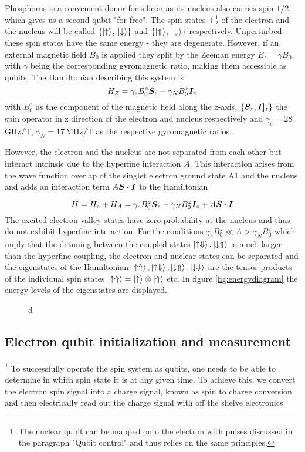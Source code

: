 Phosphorus is a convenient donor for silicon as its nucleus also carries spin $1/2$ which gives us a second qubit "for free". 
The spin states $\pm \frac{1}{2}$ of the electron and the nucleus will be called $\{\ket{\uparrow}$, $\ket{\downarrow}\}$ and $\{\ket{\Uparrow}$, $\ket{\Downarrow}\}$ respectively. Unperturbed these spin states have the same energy - they are degenerate. However, if an external magnetic field $B_0$ is applied they split by the Zeeman energy $E_z=\gamma B_0$, with $\gamma$ being the corresponding gyromagnetic ratio, making them accessible as qubits. The Hamiltonian describing this system is 
\begin{equation}
H_Z=\gamma_e B^z_0 \boldsymbol{S}_z-\gamma_N B_0^z \boldsymbol{I}_z
\end{equation}
with $B_0^z$ as the component of the magnetic field along the z-axis, $\{\boldsymbol{S}_z,\boldsymbol{I]}_z\}$ the spin operator in z direction of the electron and nucleus respectively and $\gamma_e=28\,$GHz/T, $\gamma_N=17\,$MHz/T as the respective gyromagnetic ratios.

However, the electron and the nucleus are not separated from each other but interact intrinsic due to the hyperfine interaction $A$. This interaction arises from the wave function overlap of the singlet electron ground state A1 and the nucleus and adds an interaction term $A\boldsymbol{S\cdot I}$ to the Hamiltonian

\begin{equation}
H=H_z+H_A=\gamma_e B^z_0 \boldsymbol{S}_z-\gamma_N B_0^z \boldsymbol{I}_z + A\boldsymbol{S\cdot I}
\end{equation}
The excited electron valley states have zero probability at the nucleus and thus do not exhibit hyperfine interaction. 
For the conditions $\gamma_eB_0^z \ll A>\gamma_N B_0^z $ which imply that the detuning between the coupled states $\ket{\uparrow\Downarrow},\ket{\downarrow\Uparrow}$ is much larger than the hyperfine coupling, the electron and nuclear states can be separated and the eigenstates of the Hamiltonian $\ket{\uparrow\Uparrow},\ket{\uparrow\Downarrow},\ket{\downarrow\Uparrow},\ket{\downarrow\Downarrow}$ are the tensor products of the individual spin states $\ket{\uparrow\Uparrow}=\ket{\uparrow}\otimes\ket{\Uparrow}$ etc. 
In figure \ref{fig:energydiagram} the energy levels of the eigenstates are displayed. 

\begin{figure}
d
\end{figure}


\subsection{Electron qubit initialization and measurement}\label{sec:qubit_initMeas}
\footnote{The nuclear qubit can be mapped onto the electron with pulses discussed in the paragraph "Qubit control" and thus relies on the same principles.}
To successfully operate the spin system as qubits, one needs to be able to determine in which spin state it is at any given time. To achieve this, we convert the electron spin signal into a charge signal, known as spin to charge conversion and then electrically read out the charge signal with off the shelve electronics.

